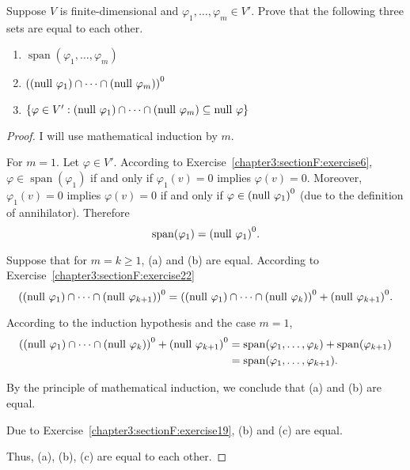 \begin{exercise}\label{chapter3:sectionF:exercise23}
    Suppose $V$ is finite-dimensional and $\varphi_{1}, \ldots, \varphi_{m}\in V'$. Prove that the following three sets are equal to each other.
    \begin{enumerate}[label={(\alph*)}]
        \item $\operatorname{span}(\varphi_{1}, \ldots, \varphi_{m})$
        \item ${((\operatorname{null}\,{\varphi_{1}})\cap \cdots \cap (\operatorname{null}\,{\varphi_{m}}))}^{0}$
        \item $\{ \varphi\in V': (\operatorname{null}\,{\varphi_{1}})\cap \cdots \cap (\operatorname{null}\,{\varphi_{m}})\subseteq \operatorname{null}\,{\varphi} \}$
    \end{enumerate}
\end{exercise}

\begin{proof}
    I will use mathematical induction by $m$.

    For $m = 1$. Let $\varphi\in V'$. According to Exercise~\ref{chapter3:sectionF:exercise6}, $\varphi\in\operatorname{span}(\varphi_{1})$ if and only if $\varphi_{1}(v) = 0$ implies $\varphi(v) = 0$. Moreover, $\varphi_{1}(v) = 0$ implies $\varphi(v) = 0$ if and only if $\varphi \in {(\operatorname{null}\,{\varphi_{1}})}^{0}$ (due to the definition of annihilator). Therefore
    \[
        \operatorname{span}(\varphi_{1}) = {(\operatorname{null}\,{\varphi_{1}})}^{0}.
    \]

    Suppose that for $m = k\geq 1$, (a) and (b) are equal. According to Exercise~\ref{chapter3:sectionF:exercise22}
    \[
        {((\operatorname{null}\,{\varphi_{1}})\cap \cdots \cap (\operatorname{null}\,{\varphi_{k+1}}))}^{0} = {((\operatorname{null}\,{\varphi_{1}})\cap \cdots \cap (\operatorname{null}\,{\varphi_{k}}))}^{0} + {(\operatorname{null}\,{\varphi_{k+1}})}^{0}.
    \]

    According to the induction hypothesis and the case $m = 1$,
    \begin{align*}
        {((\operatorname{null}\,{\varphi_{1}})\cap \cdots \cap (\operatorname{null}\,{\varphi_{k}}))}^{0} + {(\operatorname{null}\,{\varphi_{k+1}})}^{0} & = \operatorname{span}(\varphi_{1}, \ldots, \varphi_{k}) + \operatorname{span}(\varphi_{k+1}) \\
                                                                                                               & = \operatorname{span}(\varphi_{1}, \ldots, \varphi_{k+1}).
    \end{align*}

    By the principle of mathematical induction, we conclude that (a) and (b) are equal.

    Due to Exercise~\ref{chapter3:sectionF:exercise19}, (b) and (c) are equal.

    Thus, (a), (b), (c) are equal to each other.
\end{proof}
\newpage

